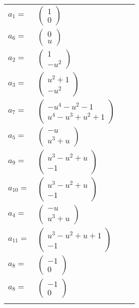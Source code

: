\documentclass[1p]{elsarticle_modified}
\theoremstyle{definition}
\begin{document}
\begin{tabular}{m{7pt} m{180pt} m{7pt} m{180pt} }
\flushright $a_{1}=$&$\begin{pmatrix}1\\0\end{pmatrix}$ \\
\flushright $a_{6}=$&$\begin{pmatrix}0\\u\end{pmatrix}$ \\
\flushright $a_{2}=$&$\begin{pmatrix}1\\- u^2\end{pmatrix}$ \\
\flushright $a_{3}=$&$\begin{pmatrix}u^2+1\\- u^2\end{pmatrix}$ \\
\flushright $a_{7}=$&$\begin{pmatrix}- u^4- u^2-1\\u^4- u^3+u^2+1\end{pmatrix}$ \\
\flushright $a_{5}=$&$\begin{pmatrix}- u\\u^3+u\end{pmatrix}$ \\
\flushright $a_{9}=$&$\begin{pmatrix}u^3- u^2+u\\-1\end{pmatrix}$ \\
\flushright $a_{10}=$&$\begin{pmatrix}u^3- u^2+u\\-1\end{pmatrix}$ \\
\flushright $a_{4}=$&$\begin{pmatrix}- u\\u^3+u\end{pmatrix}$ \\
\flushright $a_{11}=$&$\begin{pmatrix}u^3- u^2+u+1\\-1\end{pmatrix}$ \\
\flushright $a_{8}=$&$\begin{pmatrix}-1\\0\end{pmatrix}$\\ \flushright $a_{8}=$&$\begin{pmatrix}-1\\0\end{pmatrix}$\\&\end{tabular}
\end{document}
